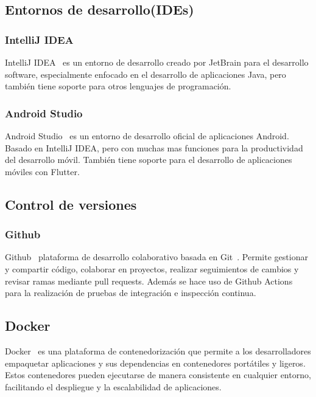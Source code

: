     \subsection{Entornos de desarrollo(IDEs)}
        \subsubsection{IntelliJ IDEA}
        IntelliJ IDEA~\cite{IDEA} es un entorno de desarrollo creado por JetBrain para el desarrollo software, especialmente enfocado en el desarrollo de aplicaciones Java, pero también tiene soporte para otros lenguajes de programación.
        \subsubsection{Android Studio}
        Android Studio~\cite{Android} es un entorno de desarrollo oficial de aplicaciones Android. Basado en IntelliJ IDEA, pero con muchas mas funciones para la productividad del desarrollo móvil. También tiene soporte para el desarrollo de aplicaciones móviles con Flutter.
    \subsection{Control de versiones}
        \subsubsection{Github}
        Github~\cite{Github} plataforma de desarrollo colaborativo basada en Git~\cite{Git}. Permite gestionar y compartir código, colaborar en proyectos, realizar seguimientos de cambios y revisar ramas mediante pull requests.
        Además se hace uso de Github Actions para la realización de pruebas de integración e inspección continua.

    \subsection{Docker}
    Docker~\cite{Docker} es una plataforma de contenedorización que permite a los desarrolladores empaquetar aplicaciones y sus dependencias en contenedores portátiles y ligeros. 
    Estos contenedores pueden ejecutarse de manera consistente en cualquier entorno, facilitando el despliegue y la escalabilidad de aplicaciones.

